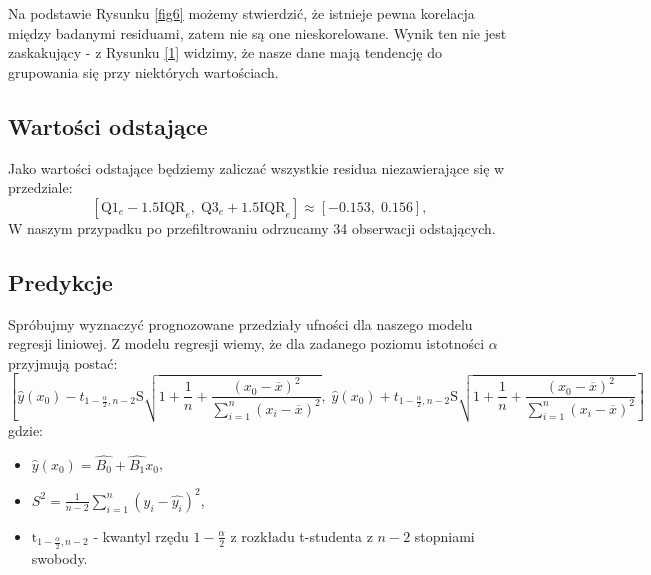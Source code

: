 \documentclass[fleqn]{article}
\begin{document}
    \noindent Na podstawie Rysunku \ref{fig6} możemy stwierdzić, że istnieje pewna korelacja między badanymi residuami, zatem nie są one nieskorelowane.
    Wynik ten nie jest zaskakujący - z Rysunku \ref{1} widzimy, że nasze dane mają tendencję do grupowania się przy niektórych wartościach.
    \subsection{Wartości odstające}
    Jako wartości odstające będziemy zaliczać wszystkie residua niezawierające się w przedziale: 
    $$[\text{Q}1_e - 1.5\text{IQR}_e,\; \text{Q}3_e + 1.5\text{IQR}_e] \approx [-0.153,\; 0.156],$$
    W naszym przypadku po przefiltrowaniu odrzucamy 34 obserwacji odstających. 
    
    \subsection{Predykcje}
    Spróbujmy wyznaczyć prognozowane przedziały ufności dla naszego modelu regresji liniowej.
    Z modelu regresji wiemy, że dla zadanego poziomu istotności $\alpha$ przyjmują postać:
    $$
        \left[\hat{y}(x_0) - t_{1-\frac{\alpha}{2},n-2}\text{S} \sqrt{1 + \frac{1}{n} + \frac{(x_0 - \overline{x})^2}{\sum_{i=1}^n(x_i-\overline{x})^2}},\; \hat{y}(x_0) + t_{1-\frac{\alpha}{2},n-2}\text{S} \sqrt{1+\frac{1}{n} + \frac{(x_0 - \overline{x})^2}{\sum_{i=1}^n(x_i-\overline{x})^2}}\right]
    $$
    gdzie:
    \begin{itemize}
        \item[] $\hat{y}(x_0) = \hat{B_0}+\hat{B_1}x_0$, 
        \item[] $S^2 = \frac{1}{n-2}\sum_{i=1}^n(y_i-\hat{y_i})^2$,
        \item[] $\text{t}_{1-\frac{\alpha}{2},n-2}$ - kwantyl rzędu $1-\frac{\alpha}{2}$ z rozkładu t-studenta z $n-2$ stopniami swobody.
    \end{itemize}
    
\end{document}
